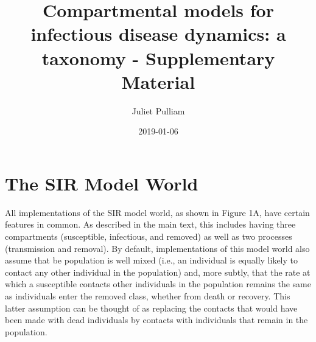 \documentclass[margin,line,11pt]{article}
\title{Compartmental models for infectious disease dynamics: a taxonomy - Supplementary Material}
\author{Juliet Pulliam}
\date{2019-01-06}
\begin{document}

\maketitle






\section{The SIR Model World}

All implementations of the SIR model world, as shown in Figure 1A, have certain features in common. 
As described in the main text, this includes having three compartments (susceptible, infectious, and removed) as well as two processes (transmission and removal). 
By default, implementations of this model world also assume that be population is well mixed (i.e., an individual is equally likely to contact any other individual in the population) and, more subtly, that the rate at which a susceptible contacts other individuals in the population remains the same as individuals enter the removed class, whether from death or recovery.
This latter assumption can be thought of as replacing the contacts that would have been made with dead individuals by contacts with individuals that remain in the population.
\end{document}
